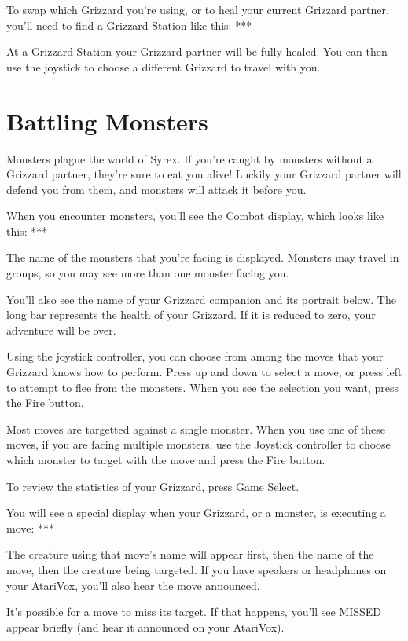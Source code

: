 \documentclass[10pt,twoside,openright]{memoir}
\begin{document}
To swap which Grizzard you're using, or to heal your current Grizzard
partner, you'll need to find a Grizzard Station like this: ***

At a Grizzard Station your Grizzard partner will be fully healed. You can
then use the joystick to choose a different Grizzard to travel with you.


\section{Battling Monsters}

Monsters plague the world of Syrex. If you're caught by monsters without a
Grizzard partner, they're sure to eat you alive! Luckily your Grizzard
partner will defend you from them, and monsters will attack it before you.

When you encounter monsters, you'll see the Combat display, which looks like
this: ***

The name of the monsters that you're facing is displayed. Monsters may
travel in groups, so you may see more than one monster facing you.

You'll also see the name of your Grizzard companion and its portrait below.
The long bar represents the health of your Grizzard. If it is reduced to
zero, your adventure will be over.

Using the joystick controller, you can choose from among the moves that your
Grizzard knows how to perform. Press up and down to select a move, or press
left to attempt to flee from the monsters. When you see the selection you
want, press the Fire button.

Most moves are targetted against a single monster.  When you use one of
these moves, if you are facing multiple monsters, use the Joystick
controller to choose which monster to target with the move and press the
Fire button.

To review the statistics of your Grizzard, press Game Select.

You will see a special display when your Grizzard, or a monster, is
executing a move: ***

The creature using that move's name will appear first, then the name of the
move, then the creature being targeted. If you have speakers or headphones
on your AtariVox, you'll also hear the move announced.

It's possible for a move to miss its target. If that happens, you'll see
MISSED appear briefly (and hear it announced on your AtariVox).
\end{document}
